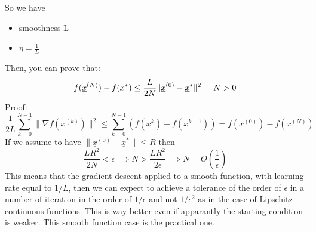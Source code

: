 So we have
\begin{itemize}
    \item smoothness L
    \item $\eta = \frac{1}{L}$
\end{itemize}
Then, you can prove that:
\[
    f(\underline{x}^{(N)}) - f(x^*) \leq \dfrac{L}{2N}\|\underline{x}^{(0)} - \underline{x}^*\|^2 \hspace{0.5cm} N > 0    
\]
Proof:
\[
    \dfrac{1}{2L} \sum_{k=0}^{N-1} \|\nabla f(\underline{x}^{(k)})\|^2 \leq \sum_{k=0}^{N-1} \left(f(\underline{x}^{k}) - f(\underline{x}^{k+1}) \right) = f(\underline{x}^{(0)}) - f(\underline{x}^{(N)})  
\]
If we assume to have $\|\underline{x}^{(0)} - \underline{x}^*\|\leq R$ then 
\[
    \dfrac{LR^2}{2N} < \epsilon \implies N > \dfrac{LR^2}{2\epsilon} \implies N = O\left(\dfrac{1}{\epsilon}\right)   
\]
This means that the gradient descent applied to a smooth function, with learning rate equal to $1/L$, then we can expect to achieve a tolerance of the order of $\epsilon$ in a number of iteration in the order of $1/\epsilon$ and not $1/\epsilon^2$ as in the case of Lipschitz continuous functions. This is way better even if apparantly the starting condition is weaker. This smooth function case is the practical one. 